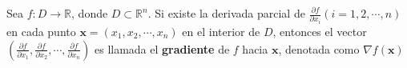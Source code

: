 \begin{itemize}
\end{itemize}
\begin{definition}
	Sea $f: D \rightarrow \mathbb{R}$, donde $D \subset \mathbb{R}^n$. Si existe la derivada parcial de $\frac{\partial f}{\partial {x}_{i}}(i=1, 2, \cdots , n)$ en cada punto $\mathbf{x}=({x}_{1},{x}_{2},\cdots,{x}_{n})$ en el interior de $D$, entonces el vector $\left( \frac{\partial f}{\partial {x}_{1}} , \frac{\partial f}{\partial {x}_{2}} , \cdots , \frac{\partial f}{\partial {x}_{n}} \right)$ es llamada el \textbf{gradiente} de $f$ hacia $\mathbf{x}$, denotada como $\nabla f\mathbf{(x)}$
\end{definition}

